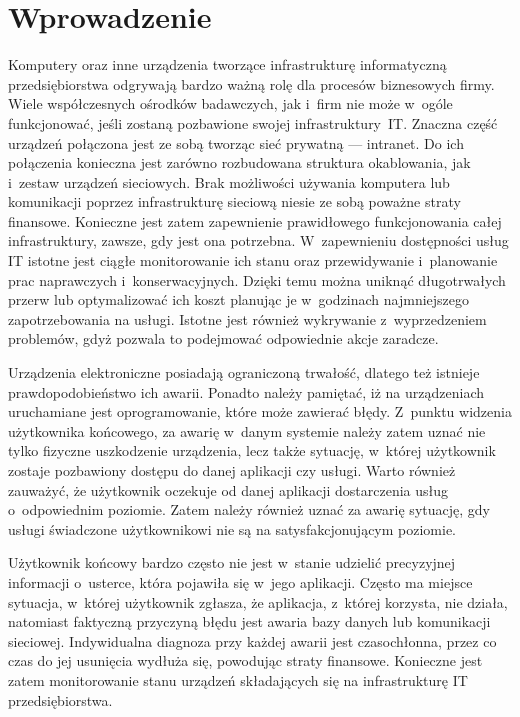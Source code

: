 \chapter{Wprowadzenie}

Komputery oraz inne urządzenia tworzące infrastrukturę informatyczną
przedsiębiorstwa odgrywają bardzo ważną rolę dla procesów biznesowych
firmy. Wiele współczesnych ośrodków badawczych, jak i~firm nie może
w~ogóle funkcjonować, jeśli zostaną pozbawione swojej
infrastruktury~IT. Znaczna część urządzeń połączona jest ze sobą
tworząc sieć prywatną --- intranet. Do ich połączenia konieczna jest
zarówno rozbudowana struktura okablowania, jak i~zestaw urządzeń
sieciowych. Brak możliwości używania komputera lub komunikacji poprzez
infrastrukturę sieciową niesie ze sobą poważne straty
finansowe. Konieczne jest zatem zapewnienie prawidłowego
funkcjonowania całej infrastruktury, zawsze, gdy jest ona
potrzebna. W~zapewnieniu dostępności usług IT istotne jest ciągłe
monitorowanie ich stanu oraz przewidywanie i~planowanie prac
naprawczych i~konserwacyjnych. Dzięki temu można uniknąć długotrwałych
przerw lub optymalizować ich koszt planując je w~godzinach
najmniejszego zapotrzebowania na usługi. Istotne jest również
wykrywanie z~wyprzedzeniem problemów, gdyż pozwala to podejmować
odpowiednie akcje zaradcze.

Urządzenia elektroniczne posiadają ograniczoną trwałość, dlatego też
istnieje prawdopodobieństwo ich awarii. Ponadto należy pamiętać, iż na
urządzeniach uruchamiane jest oprogramowanie, które może zawierać
błędy. Z~punktu widzenia użytkownika końcowego, za awarię w~danym
systemie należy zatem uznać nie tylko fizyczne uszkodzenie urządzenia,
lecz także sytuację, w~której użytkownik zostaje pozbawiony dostępu do
danej aplikacji czy usługi. Warto również zauważyć, że użytkownik
oczekuje od danej aplikacji dostarczenia usług o~odpowiednim
poziomie. Zatem należy również uznać za awarię sytuację, gdy usługi
świadczone użytkownikowi nie są na satysfakcjonującym poziomie.

Użytkownik końcowy bardzo często nie jest w~stanie udzielić
precyzyjnej informacji o~usterce, która pojawiła się w~jego
aplikacji. Często ma miejsce sytuacja, w~której użytkownik zgłasza, że
aplikacja, z~której korzysta, nie działa, natomiast faktyczną
przyczyną błędu jest awaria bazy danych lub komunikacji
sieciowej. Indywidualna diagnoza przy każdej awarii jest czasochłonna,
przez co czas do jej usunięcia wydłuża się, powodując straty
finansowe. Konieczne jest zatem monitorowanie stanu urządzeń
składających się na infrastrukturę IT przedsiębiorstwa.

